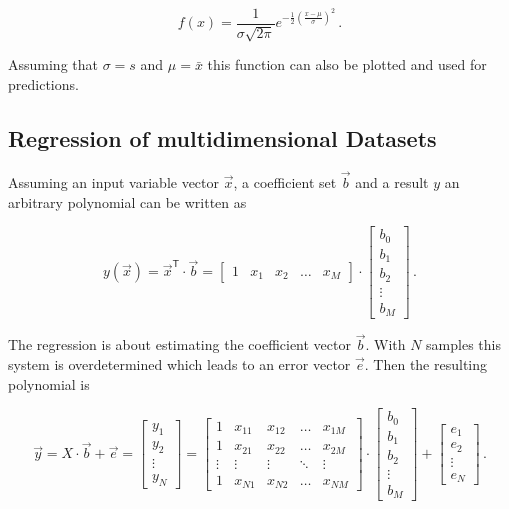 \begin{equation}
f\left( x \right) = \frac{1}{\sigma\sqrt{2\pi}}e^{-\frac{1}{2}\left(\frac{x-\mu}{\sigma}\right)^2}\,.
\end{equation}

Assuming that $\sigma = s$ and $\mu = \bar{x}$ this function can also be plotted and used for predictions.

\subsection{Regression of multidimensional Datasets}
\label{sec:regod} 
Assuming an input variable vector $\vec{x}$, a coefficient set $\vec{b}$ and a result $y$ an arbitrary polynomial can be written as \cite{sip}

\begin{equation}
y\left(\vec{x}\right) = \vec{x}^{\mathsf T}\cdot\vec{b}=\begin{bmatrix}
1 & x_1 & x_2 & \dots & x_M
\end{bmatrix} \cdot \begin{bmatrix}
b_0 \\ b_1 \\ b_2 \\ \vdots \\ b_M
\end{bmatrix}\,.
\end{equation}

The regression is about estimating the coefficient vector $\vec{b}$. With $N$ samples this system is overdetermined which leads to an error vector $\vec{e}$. Then the resulting polynomial is

\begin{equation}
\vec{y}=X\cdot \vec{b}+\vec{e}=\begin{bmatrix}
y_1 \\ y_2 \\ \vdots \\ y_N
\end{bmatrix} = \begin{bmatrix}
1 & x_{11} & x_{12} & \dots & x_{1M} \\
1 & x_{21} & x_{22} & \dots & x_{2M} \\
\vdots & \vdots & \vdots & \ddots & \vdots \\
1 & x_{N1} & x_{N2} & \dots & x_{NM}
\end{bmatrix} \cdot \begin{bmatrix}
b_0 \\ b_1 \\ b_2 \\ \vdots \\ b_M
\end{bmatrix} + \begin{bmatrix}
e_1 \\ e_2 \\ \vdots \\ e_N
\end{bmatrix}\,.
\end{equation}

